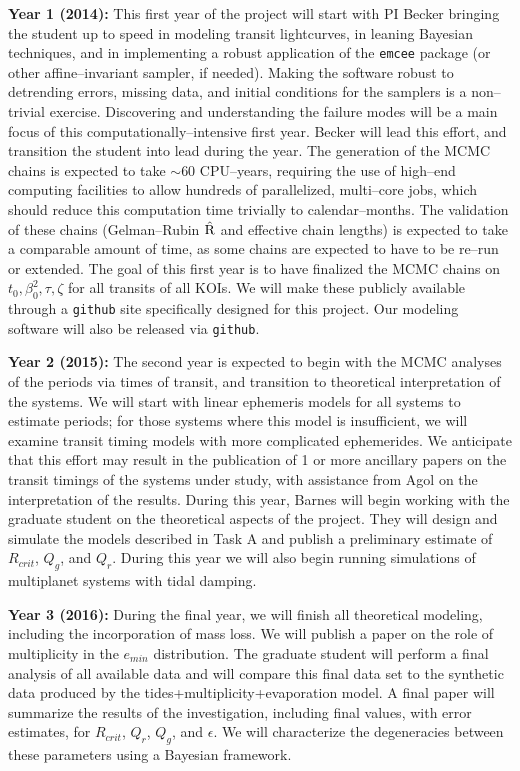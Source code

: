 {\bf Year 1 (2014):} This first year of the project will start with PI
Becker bringing the student up to speed in modeling transit
lightcurves, in leaning Bayesian techniques, and in implementing a
robust application of the {\tt emcee} package (or other
affine--invariant sampler, if needed).  Making the software robust to
detrending errors, missing data, and initial conditions for the
samplers is a non--trivial exercise.  Discovering and understanding
the failure modes will be a main focus of this
computationally--intensive first year.  Becker will lead this effort,
and transition the student into lead during the year.  The generation
of the MCMC chains is expected to take $\sim 60$ CPU--years, requiring
the use of high--end computing facilities to allow hundreds of
parallelized, multi--core jobs, which should reduce this computation
time trivially to calendar--months. The validation of these chains
(Gelman--Rubin $\hat{\rm R}$ and effective chain lengths) is expected
to take a comparable amount of time, as some chains are expected to
have to be re--run or extended.  The goal of this first year is to
have finalized the MCMC chains on $t_0, \beta_0^2, \tau, \zeta$ for
all transits of all KOIs.  We will make these publicly available
through a {\tt github} site specifically designed for this project.
Our modeling software will also be released via {\tt github}.

{\bf Year 2 (2015):} The second year is expected to begin with the
MCMC analyses of the periods via times of transit, and transition to
theoretical interpretation of the systems.  We will start with linear
ephemeris models for all systems to estimate periods; for those
systems where this model is insufficient, we will examine transit
timing models with more complicated ephemerides.  We anticipate that
this effort may result in the publication of 1 or more ancillary
papers on the transit timings of the systems under study, with
assistance from Agol on the interpretation of the results. During this
year, Barnes will begin working with the graduate student on the
theoretical aspects of the project. They will design and simulate the
models described in Task A and publish a preliminary estimate of
$R_{crit}$, $Q_g$, and $Q_r$. During this year we will also begin
running simulations of multiplanet systems with tidal damping.

{\bf Year 3 (2016):} During the final year, we will finish all
theoretical modeling, including the incorporation of mass loss.  We
will publish a paper on the role of multiplicity in the $e_{min}$
distribution. The graduate student will perform a final analysis of
all available \kepler data and will compare this final data set to the
synthetic data produced by the tides+multiplicity+evaporation model.
A final paper will summarize the results of the investigation,
including final values, with error estimates, for $R_{crit}$, $Q_r$,
$Q_g$, and $\epsilon$.  We will characterize the degeneracies between
these parameters using a Bayesian framework.




